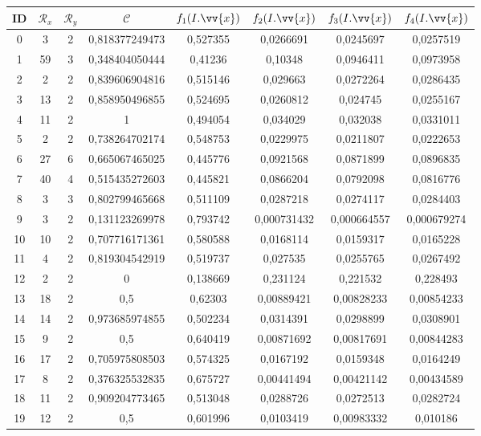 \scriptsize
\begin{longtable}{|c|c|c|c|c|c|c|c|}
\hline
ID & $\mathscr{R}_x$ & $\mathscr{R}_y$ & $\mathscr{C}$ & $f_1(I.\vv{x})$ & $f_2(I.\vv{x})$ & $f_3(I.\vv{x})$ & $f_4(I.\vv{x})$ \\
\hline
0 & 3 & 2 & 0,818377249473 & 0,527355 & 0,0266691 & 0,0245697 & 0,0257519  \\
1 & 59 & 3 & 0,348404050444 & 0,41236 & 0,10348 & 0,0946411 & 0,0973958  \\
2 & 2 & 2 & 0,839606904816 & 0,515146 & 0,029663 & 0,0272264 & 0,0286435  \\
3 & 13 & 2 & 0,858950496855 & 0,524695 & 0,0260812 & 0,024745 & 0,0255167  \\
4 & 11 & 2 & 1 & 0,494054 & 0,034029 & 0,032038 & 0,0331011  \\
5 & 2 & 2 & 0,738264702174 & 0,548753 & 0,0229975 & 0,0211807 & 0,0222653  \\
6 & 27 & 6 & 0,665067465025 & 0,445776 & 0,0921568 & 0,0871899 & 0,0896835  \\
7 & 40 & 4 & 0,515435272603 & 0,445821 & 0,0866204 & 0,0792098 & 0,0816776  \\
8 & 3 & 3 & 0,802799465668 & 0,511109 & 0,0287218 & 0,0274117 & 0,0284403  \\
9 & 3 & 2 & 0,131123269978 & 0,793742 & 0,000731432 & 0,000664557 & 0,000679274  \\
10 & 10 & 2 & 0,707716171361 & 0,580588 & 0,0168114 & 0,0159317 & 0,0165228  \\
11 & 4 & 2 & 0,819304542919 & 0,519737 & 0,027535 & 0,0255765 & 0,0267492  \\
12 & 2 & 2 & 0 & 0,138669 & 0,231124 & 0,221532 & 0,228493  \\
13 & 18 & 2 & 0,5 & 0,62303 & 0,00889421 & 0,00828233 & 0,00854233  \\
14 & 14 & 2 & 0,973685974855 & 0,502234 & 0,0314391 & 0,0298899 & 0,0308901  \\
15 & 9 & 2 & 0,5 & 0,640419 & 0,00871692 & 0,00817691 & 0,00844283  \\
16 & 17 & 2 & 0,705975808503 & 0,574325 & 0,0167192 & 0,0159348 & 0,0164249  \\
17 & 8 & 2 & 0,376325532835 & 0,675727 & 0,00441494 & 0,00421142 & 0,00434589  \\
18 & 11 & 2 & 0,909204773465 & 0,513048 & 0,0288726 & 0,0272513 & 0,0282724  \\
19 & 12 & 2 & 0,5 & 0,601996 & 0,0103419 & 0,00983332 & 0,010186  \\

\end{longtable}
